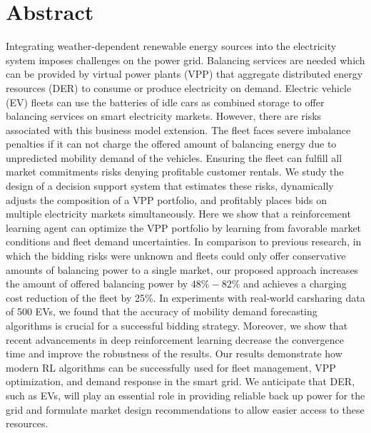 \documentclass[a4paper, 12pt]{article}
\begin{document}
\section*{Abstract} Integrating weather-dependent renewable energy sources
into the electricity system imposes challenges on the power grid. Balancing
services are needed which can be provided by virtual power plants (VPP) that
aggregate distributed energy resources (DER) to consume or produce electricity
on demand. Electric vehicle (EV) fleets can use the batteries of idle cars as
combined storage to offer balancing services on smart electricity markets.
However, there are risks associated with this business model extension. The
fleet faces severe imbalance penalties if it can not charge the offered amount
of balancing energy due to unpredicted mobility demand of the vehicles. Ensuring
the fleet can fulfill all market commitments risks denying profitable customer
rentals. We study the design of a decision support system that estimates these
risks, dynamically adjusts the composition of a VPP portfolio, and profitably
places bids on multiple electricity markets simultaneously. Here we show that a
reinforcement learning agent can optimize the VPP portfolio by learning from
favorable market conditions and fleet demand uncertainties. In comparison to
previous research, in which the bidding risks were unknown and fleets could only
offer conservative amounts of balancing power to a single market, our proposed
approach increases the amount of offered balancing power by $48\% - 82\%$  and
achieves a charging cost reduction of the fleet by 25\%. In experiments with
real-world carsharing data of 500 EVs, we found that the accuracy of mobility
demand forecasting algorithms is crucial for a successful bidding strategy.
Moreover, we show that recent advancements in deep reinforcement learning
decrease the convergence time and improve the robustness of the results. Our
results demonstrate how modern RL algorithms can be successfully used for fleet
management, VPP optimization, and demand response in the smart grid. We
anticipate that DER, such as EVs, will play an essential role in providing
reliable back up power for the grid and formulate market design recommendations
to allow easier access to these resources.

\vspace*{\fill}
\clearpage

\setcounter{page}{1}
\tableofcontents
\clearpage
\listoffigures
\clearpage
\listoftables
\clearpage
\end{document}
